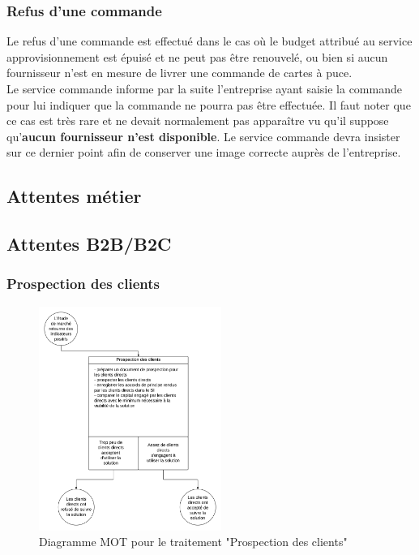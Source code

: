 \subsubsection{Refus d'une commande}

Le refus d'une commande est effectué dans le cas où le budget attribué au
service approvisionnement est épuisé et ne peut pas être renouvelé, ou bien si
aucun fournisseur n'est en mesure de livrer une commande de cartes à puce. \\

Le service commande informe par la suite l'entreprise ayant saisie la commande
pour lui indiquer que la commande ne pourra pas être effectuée. Il faut noter
que ce cas est très rare et ne devait normalement pas apparaître vu qu'il
suppose qu'\textbf{aucun fournisseur n'est disponible}. Le service commande
devra insister sur ce dernier point afin de conserver une image correcte auprès
de l'entreprise.

\subsection{Attentes métier}
\subsection{Attentes B2B/B2C}

\subsubsection{Prospection des clients}

\begin{figure}
    \centering
    \includegraphics[width=0.53\textwidth]{mot-prospection-clients}
    \caption{Diagramme MOT pour le traitement "Prospection des clients"}
    \label{fig:mot-prospection-clients}
\end{figure}


